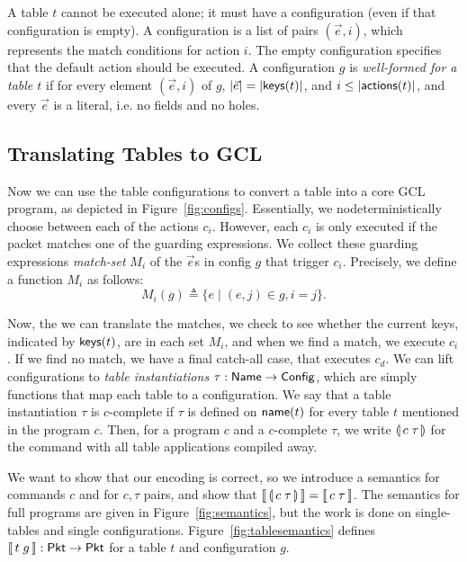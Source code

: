 A table $t$ cannot be executed alone; it must have a configuration
(even if that configuration is empty). A configuration is a list of
pairs $(\vec e,i)$, which represents the match conditions for action
$i$. The empty configuration specifies that the default action should
be executed. A configuration $g$ is \emph{well-formed for a table $t$}
if for every element $(\vec e, i)$ of $g$, $|\vec e| = |\mathsf{keys}(t)|$, and
$i \leq |\mathsf{actions}(t)|$, and every $\vec e$ is a literal, i.e. no fields
and no holes.

\subsection{Translating Tables to GCL}

Now we can use the table configurations to convert a table into a core
GCL program, as depicted in Figure~\ref{fig:configs}. Essentially, we
nodeterministically choose between each of the actions $c_i$. However,
each $c_i$ is only executed if the packet matches one of the guarding
expressions. We collect these guarding expressions \emph{match-set}
$M_i$ of the $\vec e$s in config $g$ that trigger $c_i$. Precisely, we
define a function $M_i$ as follows:
\[M_i(g) \triangleq \{ e \mid (e,j) \in g, i = j\}.\]

Now, the we can translate the matches, we check to see whether the
current keys, indicated by $\mathsf{keys}(t)$, are in each set $M_i$, and when
we find a match, we execute $c_i$. If we find no match, we have a
final catch-all case, that executes $c_d$. We can lift configurations
to \emph{table instantiations} $\tau : \mathsf{Name} \to \mathsf{Config}$, which are
simply functions that map each table to a configuration. We say that a
table instantiation $\tau$ is $c$-complete if $\tau$ is defined on
$\mathsf{name}(t)$ for every table $t$ mentioned in the program $c$. Then, for
a program $c$ and a $c$-complete $\tau$, we write $\llparenthesis\, c\; \tau\, \rrparenthesis$
for the command with all table applications compiled away.

We want to show that our encoding is correct, so we introduce a semantics for
commands $c$ and for $c,\tau$ pairs, and show that
$\llbracket\,\llparenthesis\, c\; \tau\, \rrparenthesis\,\rrbracket = \llbracket\,c\; \tau\,\rrbracket$. The semantics for full
programs are given in Figure~\ref{fig:semantics}, but the work is done on
single-tables and single configurations. Figure~\ref{fig:tablesemantics} defines
$\llbracket\,t\; g\,\rrbracket : \mathsf{Pkt} \to \mathsf{Pkt}$ for a table $t$ and configuration $g$.

